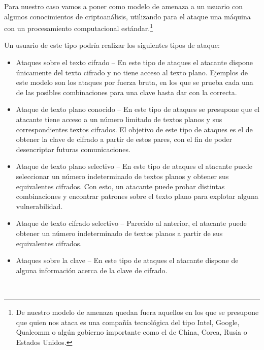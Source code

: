 Para nuestro caso vamos a poner como modelo de amenaza a un usuario con algunos
conocimientos de criptoanálisis, utilizando para el ataque una máquina con un
procesamiento computacional estándar.\footnote{De nuestro modelo de amenaza
quedan fuera aquellos en los que se presupone que quien nos ataca es una compañía
tecnológica del tipo Intel, Google, Qualcomm o algún gobierno importante como el
de China, Corea, Rusia o Estados Unidos.}

Un usuario de este tipo podría realizar los siguientes tipos de ataque:

\begin{itemize}
  \item Ataques sobre el texto cifrado -- En este tipo de ataques el atacante
  dispone únicamente del texto cifrado y no tiene acceso al texto plano.
  Ejemplos de este modelo son los ataques por fuerza bruta, en los que se prueba
  cada una de las posibles combinaciones para una clave hasta dar con la correcta.

  \item Ataque de texto plano conocido -- En este tipo de ataques se presupone
  que el atacante tiene acceso a un número limitado de textos planos y sus
  correspondientes textos cifrados. El objetivo de este tipo de ataques es el de
  obtener la clave de cifrado a partir de estos pares, con el fin de poder
  desencriptar futuras comunicaciones.

  \item Ataque de texto plano selectivo -- En este tipo de ataques el atacante puede
  seleccionar un número indeterminado de textos planos y obtener sus equivalentes
  cifrados. Con esto, un atacante puede probar distintas combinaciones y encontrar
  patrones sobre el texto plano para explotar alguna vulnerabilidad.

  \item Ataque de texto cifrado selectivo -- Parecido al anterior, el atacante
  puede obtener un número indeterminado de textos planos a partir de sus
  equivalentes cifrados.

  \item Ataques sobre la clave -- En este tipo de ataques el atacante dispone de
  alguna información acerca de la clave de cifrado.
\end{itemize} \emph{\parencite{Reference20}}\\

